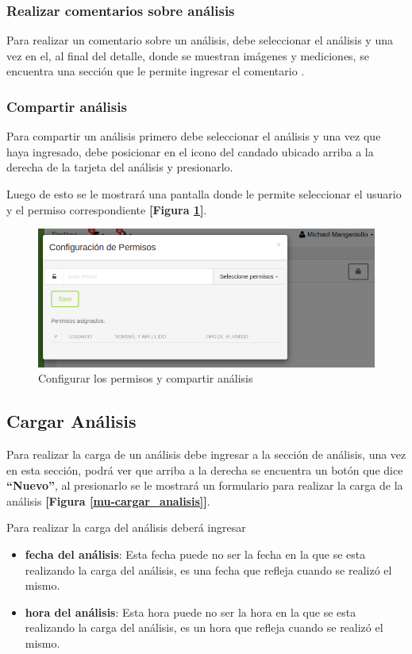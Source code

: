  \subsubsection{Realizar comentarios sobre análisis}
 Para realizar un comentario sobre un análisis, debe seleccionar el análisis y una vez en el, al final del detalle, donde se muestran imágenes y mediciones, se encuentra una sección que le permite ingresar el comentario .

\subsubsection{Compartir análisis}
Para compartir un análisis primero debe seleccionar el análisis y una vez que haya ingresado, debe posicionar en el icono del candado ubicado arriba a la derecha de la tarjeta del análisis y presionarlo. 

Luego de esto  se le mostrará una pantalla donde le permite seleccionar el usuario y el permiso correspondiente \textbf{[Figura \ref{mu-configurar_permiso}]}.

\begin{figure}
	\centering
	\includegraphics[width=.8\textwidth]{img/manual_de_usuario/configurar_permiso}
	\caption{Configurar los permisos y compartir análisis}
	\label{mu-configurar_permiso}
\end{figure}


 \subsection{Cargar Análisis}
 Para realizar la carga de un análisis debe ingresar a la sección de análisis, una vez en esta sección, podrá ver que arriba a la derecha se encuentra un botón que dice \textbf{``Nuevo''}, al presionarlo se le mostrará un formulario para realizar la carga de la análisis \textbf{[Figura \ref{mu-cargar_analisis}]}.
 
 Para realizar la carga del análisis deberá ingresar 
 \begin{itemize}
 	\item  \textbf{fecha del análisis}:  Esta fecha puede no ser la fecha en la que se esta realizando la carga del análisis, es una fecha que refleja cuando se realizó el mismo.
 	\item \textbf{hora del análisis}: Esta hora puede no ser la hora en la que se esta realizando la carga del análisis, es un hora que refleja cuando se realizó el mismo.
 \end{itemize}
 
